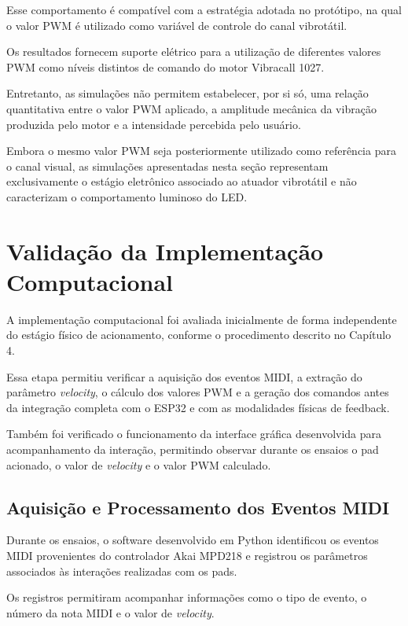 Esse comportamento é compatível com a estratégia adotada no protótipo, na qual o valor PWM é utilizado como variável de controle do canal vibrotátil.

Os resultados fornecem suporte elétrico para a utilização de diferentes valores PWM como níveis distintos de comando do motor Vibracall 1027.

Entretanto, as simulações não permitem estabelecer, por si só, uma relação quantitativa entre o valor PWM aplicado, a amplitude mecânica da vibração produzida pelo motor e a intensidade percebida pelo usuário.

Embora o mesmo valor PWM seja posteriormente utilizado como referência para o canal visual, as simulações apresentadas nesta seção representam exclusivamente o estágio eletrônico associado ao atuador vibrotátil e não caracterizam o comportamento luminoso do LED.


\section{Validação da Implementação Computacional}
\label{sec:resultados_implementacao_computacional}


A implementação computacional foi avaliada inicialmente de forma independente do estágio físico de acionamento, conforme o procedimento descrito no Capítulo 4.

Essa etapa permitiu verificar a aquisição dos eventos MIDI, a extração do parâmetro \textit{velocity}, o cálculo dos valores PWM e a geração dos comandos antes da integração completa com o ESP32 e com as modalidades físicas de feedback.

Também foi verificado o funcionamento da interface gráfica desenvolvida para acompanhamento da interação, permitindo observar durante os ensaios o pad acionado, o valor de \textit{velocity} e o valor PWM calculado.

\subsection{Aquisição e Processamento dos Eventos MIDI}
\label{sec:resultado_aquisicao_midi}

Durante os ensaios, o software desenvolvido em Python identificou os eventos MIDI provenientes do controlador Akai MPD218 e registrou os parâmetros associados às interações realizadas com os pads.

Os registros permitiram acompanhar informações como o tipo de evento, o número da nota MIDI e o valor de \textit{velocity}.

